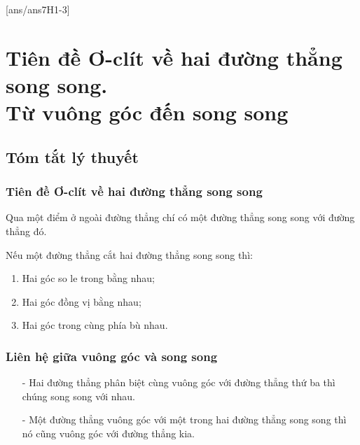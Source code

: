 [ans/ans7H1-3]
\section{Tiên đề Ơ-clít về hai đường thẳng song song.\\ Từ vuông góc đến song song}
\subsection{Tóm tắt lý thuyết}
\subsubsection{Tiên đề Ơ-clít về hai đường thẳng song song}
Qua một điểm ở ngoài đường thẳng chí có một đường thẳng song song với đường thẳng đó.

\begin{center}
\end{center}
\begin{tc}
	Nếu một đường thẳng cắt hai đường thẳng song song thì:
	\begin{enumerate}
		\item Hai góc so le trong bằng nhau;
		\item Hai góc đồng vị bằng nhau;
		\item Hai góc trong cùng phía bù nhau.
	\end{enumerate}
	\end{tc}

\subsubsection{Liên hệ giữa vuông góc và song song}
\begin{tc}
	\begin{itemize}
		\item [-] Hai đường thẳng phân biệt cùng vuông góc với đường thẳng thứ ba thì chúng song song với nhau.
		\item [-] Một đường thẳng vuông góc với một trong hai đường thẳng song song thì nó cũng vuông góc với đường thẳng kia.
	\end{itemize}
\begin{center}
\end{center}
\end{tc}

